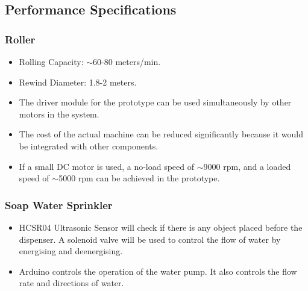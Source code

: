 \documentclass[table,french,english]{rapportCS}
\begin{document}
\subsection{Performance Specifications}\label{sec:perfspecs}
    \subsubsection*{Roller}
        \begin{itemize}[label=$\bullet$]
        \item Rolling Capacity: $\sim$60-80 meters/min.
    \item Rewind Diameter: 1.8-2 meters.
    \item The driver module for the prototype can be used simultaneously by other motors in the system.
    \item The cost of the actual machine can be reduced significantly because it would be integrated with other components.
    \item If a small DC motor is used, a no-load speed of $\sim$9000 rpm, and a loaded speed of $\sim$5000 rpm can be achieved in the prototype. 
        \end{itemize}
    \subsubsection*{Soap Water Sprinkler}
        \begin{itemize}[label=$\bullet$]
        \item HCSR04 Ultrasonic Sensor will check if there is any object placed before the dispenser. A solenoid valve will be used to control the flow of water by energising and deenergising. 
        \item Arduino controls the operation of the water pump. It also controls the flow rate and directions of water.
        \end{itemize}
\end{document}
